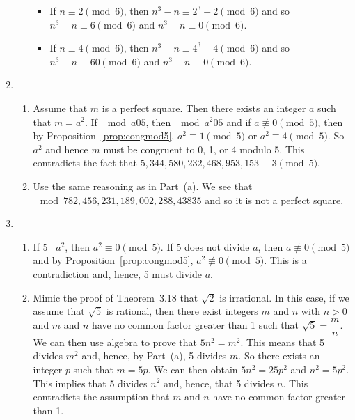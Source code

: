 \begin{enumerate}
\begin{enumerate}
\begin{itemize}
\item If $n \equiv 2 \pmod 6$, then $n^3 - n \equiv 2^3 - 2 \pmod 6$ and so 
$n^3 - n \equiv 6 \pmod 6$ and $n^3 - n \equiv 0 \pmod 6$.

\item If $n \equiv 4 \pmod 6$, then $n^3 - n \equiv 4^3 - 4 \pmod 6$ and so 
$n^3 - n \equiv 60 \pmod 6$ and $n^3 - n \equiv 0 \pmod 6$.
\end{itemize}
\end{enumerate}

\item  \begin{enumerate}
\item Assume that $m$ is a perfect square.  Then there exists an integer $a$ such that $m = a^2$.  If $\mod{a}{0}{5}$, then $\mod{a^2}{0}{5}$ and if $a \not\equiv 0 \pmod 5$, then by Proposition~\ref{prop:congmod5},  
 $a^2 \equiv 1 \pmod 5$ or $a^2 \equiv 4 \pmod 5$.  So $a^2$ and hence $m$ must be congruent to 0, 1, or 4 modulo 5.  This contradicts the fact that $5,344,580,232,468,953,153 \equiv 3 \pmod 5$.

\item Use the same reasoning as in Part~(a).  We see that \\$\mod{782,456,231,189,002,288,438}{3}{5}$ and so it is not a perfect square.
\end{enumerate}






\item \begin{enumerate}
\item If $5 \mid a^2$, then $a^2 \equiv 0 \pmod 5$.  If 5 does not divide $a$, then 
$a \not\equiv 0 \pmod 5$ and by Proposition~\ref{prop:congmod5}, $a^2 \not\equiv 0 \pmod 5$.  This is a contradiction and, hence, 5 must divide $a$.

\item Mimic the proof of Theorem~3.18 that $\sqrt{2}$ is irrational.  In this case, if we assume that $\sqrt{5}$ is rational, then there exist integers $m$ and $n$ with $n > 0$ and $m$ and $n$ have no common factor greater than 1 such that $\sqrt{5} = \dfrac{m}{n}$.  We can then use algebra to prove that $5n^2 = m^2$.  This means that 5 divides $m^2$ and, hence, by Part~(a), 5 divides $m$.  So there exists an integer $p$ such that $m = 5p$.  We can then obtain $5n^2 = 25p^2$ and $n^2 = 5p^2$.  This implies that 5 divides $n^2$ and, hence, that 5 divides $n$.  This contradicts the assumption that $m$ and $n$ have no common factor greater than 1.
\end{enumerate}



\end{enumerate}
